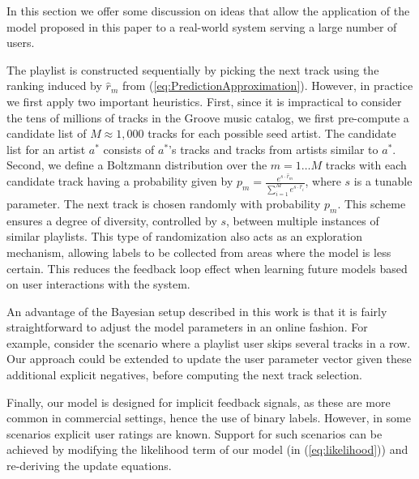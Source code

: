 In this section we offer some discussion on ideas that allow the application of the model proposed in this paper to a real-world system serving a large number of users.

The playlist is constructed sequentially by picking the next track using the ranking induced by $\hat{r}_m$ from (\ref{eq:PredictionApproximation}). However, in practice we first apply two important heuristics. First, since it is impractical to consider the tens of millions of tracks in the Groove music catalog, we first pre-compute a candidate list of $M \approx 1,000$ tracks for each possible seed artist.
The candidate list for an artist $a^*$ consists of $a^*$'s tracks and tracks from artists similar to $a^*$. Second, we define a Boltzmann distribution over the $m=1 \dots M$ tracks with each candidate track having a probability given by $p_m=\frac{e^{s \cdot \hat{r}_m}}{\sum_{i=1}^M e^{s \cdot \hat{r}_i}}$, where $s$ is a tunable parameter. The next track is chosen randomly with probability $p_m$. This scheme ensures a degree of diversity, controlled by $s$, between multiple instances of similar playlists. This type of randomization also acts as an exploration mechanism, allowing labels to be collected from areas where the model is less certain. This reduces the feedback loop effect when learning future models based on user interactions with the system.



An advantage of the Bayesian setup described in this work is that it is fairly straightforward to adjust the model parameters in an online fashion. For example, consider the scenario where a playlist user skips several tracks in a row. Our approach could be extended to update the user parameter vector given these additional explicit negatives, before computing the next track selection.

Finally, our model is designed for implicit feedback signals, as these are more common in commercial settings, hence the use of binary labels. However, in some scenarios explicit user ratings are known. Support for such scenarios can be achieved by modifying the likelihood term of our model (in (\ref{eq:likelihood})) and re-deriving the update equations.
  
